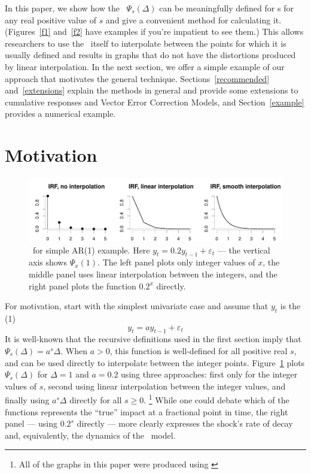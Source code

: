 \documentclass[12pt,fleqn]{article}
\newcommand{\vep}{\varepsilon}
\newcommand{\AR}{\allcaps{AR}}
\begin{document}
In this paper, we show how the \IRF\ $\Psi_s(\Delta)$ can be meaningfully
defined for \VAR s for any real positive value of $s$ and give a
convenient method for calculating it. (Figures~\ref{f1} and~\ref{f2}
have examples if you're impatient to see them.) This allows
researchers to use the \VAR\ itself to interpolate between the points
for which it is usually defined and results in graphs that do not have
the distortions produced by linear interpolation. In the next section,
we offer a simple example of our approach that motivates the general
technique. Sections~\ref{recommended} and~\ref{extensions} explain the
methods in general and provide some extensions to cumulative responses
and Vector Error Correction Models, and Section~\ref{example} provides
a numerical example.

\section{Motivation}

\begin{figure}[t]
  \centering
  \includegraphics{graphs/motivation.pdf}
  \caption{\IRF\ for simple AR(1) example. Here $y_t = 0.2 y_{t-1} +
    \vep_t$ --- the vertical axis shows $\Psi_x(1)$. The left panel
    plots only integer values of $x$, the middle panel uses linear
    interpolation between the integers, and the right panel plots the
    function $0.2^x$ directly.}
  \label{f0}
\end{figure}

For motivation, start with the simplest univariate case and assume
that $y_t$ is the \AR(1)
\begin{equation*}
y_t = a y_{t-1} + \vep_t
\end{equation*}
It is well-known that the recursive definitions used in the first
section imply that $\Psi_s(\Delta) = a^s \Delta$.  When $a > 0$, this
function is well-defined for all positive real $s$, and can be used
directly to interpolate between the integer points. Figure~\ref{f0}
plots $\Psi_s(\Delta)$ for $\Delta = 1$ and $a = 0.2$ using three
approaches: first only for the integer values of $s$, second using
linear interpolation between the integer values, and finally using
$a^s \Delta$ directly for all $s \geq 0$.%
\footnote{All of the graphs in this paper were produced using
  \citet{R}} %
While one could debate which of the functions represents the ``true''
impact at a fractional point in time, the right panel --- using
$0.2^s$ directly --- more clearly expresses the shock's rate of decay
and, equivalently, the dynamics of the \AR\ model.
\end{document}
